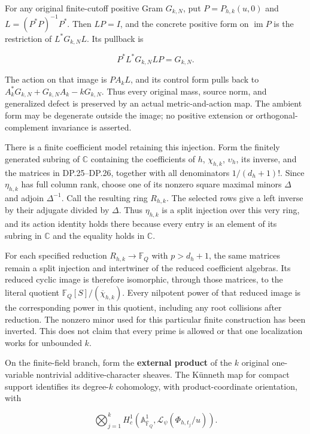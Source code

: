 \documentclass{article}
\begin{document}
For any original finite-cutoff positive Gram \(G_{k,N}\), put \(P=P_{h,k}(u,0)\) and \(L=(P^*P)^{-1}P^*\). Then \(LP=I\), and the concrete positive form on \(\operatorname{im}P\) is the restriction of \(L^*G_{k,N}L\). Its pullback is

\[
P^*L^*G_{k,N}LP=G_{k,N}.
\tag{DP.32}
\]

The action on that image is \(PA_kL\), and its control form pulls back to \(A_k^*G_{k,N}+G_{k,N}A_k-kG_{k,N}\). Thus every original mass, source norm, and generalized defect is preserved by an actual metric-and-action map. The ambient form may be degenerate outside the image; no positive extension or orthogonal-complement invariance is asserted.

There is a finite coefficient model retaining this injection. Form the finitely generated subring of \(\mathbb C\) containing the coefficients of \(h\), \(\chi_{h,k}\), \(\upsilon_h\), its inverse, and the matrices in DP.25--DP.26, together with all denominators \(1/(d_h+1)!\). Since \(\eta_{h,k}\) has full column rank, choose one of its nonzero square maximal minors \(\Delta\) and adjoin \(\Delta^{-1}\). Call the resulting ring \(R_{h,k}\). The selected rows give a left inverse by their adjugate divided by \(\Delta\). Thus \(\eta_{h,k}\) is a split injection over this very ring, and its action identity holds there because every entry is an element of its subring in \(\mathbb C\) and the equality holds in \(\mathbb C\).

For each specified reduction \(R_{h,k}\to\mathbb F_Q\) with \(p>d_h+1\), the same matrices remain a split injection and intertwiner of the reduced coefficient algebras. Its reduced cyclic image is therefore isomorphic, through those matrices, to the literal quotient \(\mathbb F_Q[S]/(\overline\chi_{h,k})\). Every nilpotent power of that reduced image is the corresponding power in this quotient, including any root collisions after reduction. The nonzero minor used for this particular finite construction has been inverted. This does not claim that every prime is allowed or that one localization works for unbounded \(k\).

On the finite-field branch, form the \textbf{external product} of the \(k\) original one-variable nontrivial additive-character sheaves. The Künneth map for compact support identifies its degree-\(k\) cohomology, with product-coordinate orientation, with

\[
\bigotimes_{j=1}^k
H_c^1(\mathbb A^1_{\overline{\mathbb F}_Q},
 \mathcal L_{\psi}(\Phi_{h,t_j}/u)).
\tag{DP.33}
\]
\end{document}
